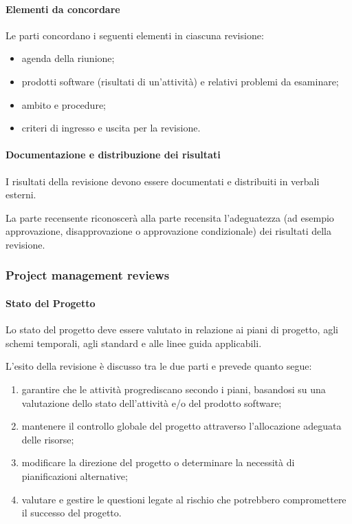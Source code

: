 \paragraph{Elementi da concordare}
Le parti concordano i seguenti elementi in ciascuna revisione: 
\begin{itemize}
    \item 
        agenda della riunione;
    \item 
        prodotti software (risultati di un'attività) e relativi problemi da esaminare;
    \item 
        ambito e procedure;
    \item 
        criteri di ingresso e uscita per la revisione.
\end{itemize}


\paragraph{Documentazione e distribuzione dei risultati} 
I risultati della revisione devono essere documentati e distribuiti in verbali esterni. 

La parte recensente riconoscerà alla parte recensita l'adeguatezza (ad esempio approvazione, disapprovazione o approvazione condizionale) dei risultati della revisione. 

\subsubsection{Project management reviews}

\paragraph{Stato del Progetto}
Lo stato del progetto deve essere valutato in relazione ai piani di progetto, agli schemi temporali, agli standard e alle linee guida applicabili. 

L'esito della revisione è discusso tra le due parti e prevede quanto segue: 

\begin{enumerate}
    \item
        garantire che le attività progrediscano secondo i piani, basandosi su una valutazione dello stato dell'attività e/o del prodotto software; 
    \item
        mantenere il controllo globale del progetto attraverso l'allocazione adeguata delle risorse; 
    \item
        modificare la direzione del progetto o determinare la necessità di pianificazioni alternative; 
    \item
        valutare e gestire le questioni legate al rischio che potrebbero compromettere il successo del progetto. 
\end{enumerate}

